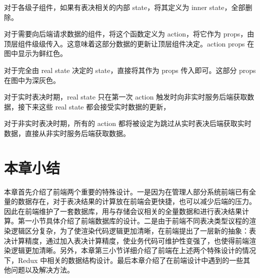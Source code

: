   对于各级子组件，如果有表决相关的内部 state，将其定义为 inner state，全部删除。

  对于需要向后端请求数据的组件，将这个函数定义为 action，将它作为 props，由顶层组件级级传入。这意味着这部分数据的更新让顶层组件决定。action props 在图中显示为鲜红色。

  对于完全由 real state 决定的 state，直接将其作为 props 传入即可。这部分 props 在图中为深灰色。

对于实时表决时期，real state 只在第一次 action 触发时向非实时服务后端获取数据，接下来这些 real state 都会接受实时数据的更新，

对于非实时表决时期，所有的 action 都将被设定为跳过从实时表决后端获取实时数据，直接从非实时服务后端获取数据。

\section{本章小结}
本章首先介绍了前端两个重要的特殊设计。一是因为在管理人部分系统前端已有全量的数据存在，对于表决结果的计算放在前端会更快捷，也可以减少后端的压力。因此在前端维护了一套数据库，用与存储会议相关的全量数据和进行表决结果计算。第一小节具体介绍了前端数据库的设计。二是由于前端不同表决类型议程的渲染逻辑区分复杂，为了使渲染代码逻辑更加清晰，在前端提出了一层新的抽象：表决计算精度，通过加入表决计算精度，使业务代码可维护性变强了，也使得前端渲染逻辑更加清晰。另外，本章第三小节详细介绍了前端在上述两个特殊设计的情况下，Redux 中相关的数据结构设计。最后本章介绍了在前端设计中遇到的一些其他问题以及解决方法。